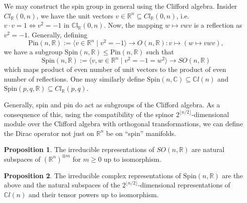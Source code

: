 \documentclass[]{article}
\theoremstyle{definition}
\theoremstyle{definition}
\newtheorem{proposition}{Proposition}[section]
\begin{document}
We may construct the spin group in general using the Clifford algebra.
Insider \(Cl_{\mathbb{R}}(0, n)\), we have the unit vectors \(v \in \mathbb{R}^n 
\subseteq Cl_{\mathbb{R}}(0, n)\), i.e. \(v \cdot v = 1 \iff v^2 = -1\) in 
\(\mathbb{Cl}_{\mathbb{R}}(0, n)\). Now, the mapping \(w \mapsto v w v\) is a
reflection as \(v^2 = -1\). Generally, defining 
\[\text{Pin}(n, \mathbb{R}) := \langle v \in \mathbb{R}^n \mid v^2 = -1 \rangle 
\to O(n, \mathbb{R}) : v \mapsto (w \mapsto v w v),\]
we have a subgroup \(\text{Spin}(n, \mathbb{R}) \le \text{Pin}(n, \mathbb{R})\) 
such that 
\[\text{Spin}(n, \mathbb{R}) := \langle v, w \in \mathbb{R}^n \mid v^2 = -1 = w^2 
\rangle \to SO(n, \mathbb{R})\]
which maps product of even number of unit vectors to the product of even number 
of reflections. One may similarly define \(\text{Spin}(n, \mathbb{C}) \subseteq 
\mathbb{C}l(n)\) and \(\text{Spin}(p, q, \mathbb{R}) \subseteq Cl_{\mathbb{R}}(p, q)\).

Generally, spin and pin do act as subgroups of the Clifford algebra. As a consequence 
of this, using the compatibility of the spinor \(2^{\lfloor n / 2 \rfloor}\)-dimensional 
module over the Clifford algebra with orthogonal transformations, we can define the 
Dirac operator not just on \(\mathbb{R}^n\) be on ``spin'' manifolds.

\begin{proposition}
  The irreducible representations of \(SO(n, \mathbb{R})\) are natural 
  subspaces of \((\mathbb{R}^n)^{\otimes m}\) for \(m \ge 0\) up to 
  isomorphism.
\end{proposition}

\begin{proposition}
  The irreducible complex representations of \(\text{Spin}(n, \mathbb{R})\) are 
  the above and the natural subspaces of the \(2^{\lfloor n / 2 \rfloor}\)-dimensional 
  representations of \(\mathbb{C}l(n)\) and their tensor powers up to isomorphism.
\end{proposition}
\end{document}
